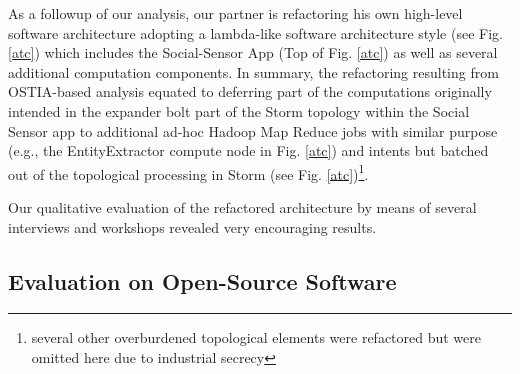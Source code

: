 As a followup of our analysis, our partner is refactoring his own high-level software architecture adopting a lambda-like software architecture style \cite{lambda} (see Fig. \ref{atc}) which includes the Social-Sensor App (Top of Fig. \ref{atc}) as well as several additional computation components. In summary, the refactoring resulting from OSTIA-based analysis equated to deferring part of the computations originally intended in the expander bolt part of the Storm topology within the Social Sensor app to additional ad-hoc Hadoop Map Reduce jobs with similar purpose (e.g., the EntityExtractor compute node in Fig. \ref{atc}) and intents but batched out of the topological processing in Storm (see Fig. \ref{atc})\footnote{several other overburdened topological elements were refactored but were omitted here due to industrial secrecy}. 

Our qualitative evaluation of the refactored architecture by means of several interviews and workshops revealed very encouraging results. 

\subsection{Evaluation on Open-Source Software}\label{os}

